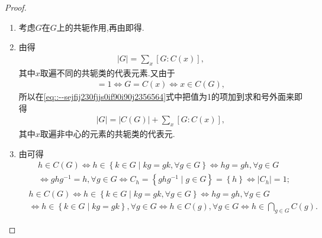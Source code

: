 \documentclass[../../main.tex]{subfiles}%
\begin{document}
\begin{proof}
\begin{enumerate}[(1)]
\item 考虑$G$在$G$上的共轭作用,再由即得.

\item 由得
\begin{align}\label{eq::--sejfij230fjjs0if90i90j2356564}
|G| = \sum_{x}[G:C(x)],
\end{align}
其中$x$取遍不同的共轭类的代表元素.又由于
\begin{align*}
[G:C(x)] = 1 \iff G = C(x) \iff x \in C(G),
\end{align*}
所以在\eqref{eq::--sejfij230fjjs0if90i90j2356564}式中把值为1的项加到求和号外面来即得
\begin{align*}
|G| = |C(G)| + \sum_{x}[G:C(x)],
\end{align*}
其中$x$取遍非中心的元素的共轭类的代表元.

\item 由可得
\begin{align*}
&h\in C(G) \Longleftrightarrow h\in \left\{ k\in G\mid kg=gk,\forall g\in G \right\} \Longleftrightarrow hg=gh,\forall g\in G\\
&\Longleftrightarrow ghg^{-1}=h,\forall g\in G\Longleftrightarrow C_h=\left\{ ghg^{-1}\mid g\in G \right\} =\left\{ h \right\} \Longleftrightarrow |C_h|=1; 
\end{align*}
\begin{align*}
&h\in C(G) \Longleftrightarrow h\in \left\{ k\in G\mid kg=gk,\forall g\in G \right\} \Longleftrightarrow hg=gh,\forall g\in G \\
&\Longleftrightarrow h\in \left\{ k\in G\mid kg=gk \right\},\forall g\in G\Longleftrightarrow h\in C(g),\forall g\in G\Longleftrightarrow h\in \bigcap\limits_{g\in G}C(g).
\end{align*}
\end{enumerate}

\end{proof}
\end{document}
